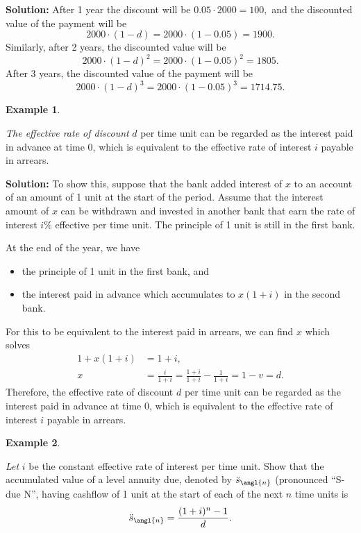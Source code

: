 \documentclass[
]{book}
\theoremstyle{definition}
\theoremstyle{definition}
\newtheorem{example}{Example}[chapter]
\theoremstyle{definition}
\theoremstyle{definition}
\theoremstyle{remark}
\begin{document}
\textbf{Solution:} After 1 year the discount will be \(0.05 \cdot 2000 = 100,\)
and the discounted value of the payment will be
\[2000 \cdot (1 - d) = 2000 \cdot (1 - 0.05) = 1900 .\] Similarly, after
2 years, the discounted value will be
\[2000 \cdot (1 - d)^2 = 2000 \cdot (1 - 0.05)^2 = 1805 .\] After 3
years, the discounted value of the payment will be
\[2000 \cdot (1 - d)^3 = 2000 \cdot (1 - 0.05)^3 = 1714.75 .\]

\begin{example}
\protect\hypertarget{exm:unlabeled-div-29}{}\label{exm:unlabeled-div-29}

\emph{The effective rate of discount} \(d\) per time unit can be regarded as
the interest paid in advance at time 0, which is equivalent to the
effective rate of interest \(i\) payable in arrears.

\end{example}

\textbf{Solution:} To show this, suppose that the bank added interest of \(x\)
to an account of an amount of 1 unit at the start of the period. Assume
that the interest amount of \(x\) can be withdrawn and invested in another
bank that earn the rate of interest \(i\%\) effective per time unit. The
principle of 1 unit is still in the first bank.

At the end of the year, we have

\begin{itemize}
\item
  the principle of 1 unit in the first bank, and
\item
  the interest paid in advance which accumulates to \(x(1+i)\) in the
  second bank.
\end{itemize}

For this to be equivalent to the interest paid in arrears, we can find
\(x\) which solves \[\begin{aligned}
     1 + x(1+i) &= 1 + i,\\
     x &= \frac{i}{1+i} = \frac{1+i}{1+i} - \frac{1}{1+i}  = 1-v = d.\end{aligned}\]
Therefore, the effective rate of discount \(d\) per time unit can be
regarded as the interest paid in advance at time 0, which is equivalent
to the effective rate of interest \(i\) payable in arrears.

\begin{example}
\protect\hypertarget{exm:unlabeled-div-30}{}\label{exm:unlabeled-div-30}

\emph{Let} \(i\) be the constant effective rate of interest per time unit. Show
that the accumulated value of a level annuity due, denoted by
\(\ddot{s}_\angl{n}\) (pronounced ``S-due N'', having cashflow of 1 unit at
the start of each of the next \(n\) time units is
\[\ddot{s}_\angl{n} = \frac{(1+i)^n -1 }{d}.\]

\end{example}
\end{document}
